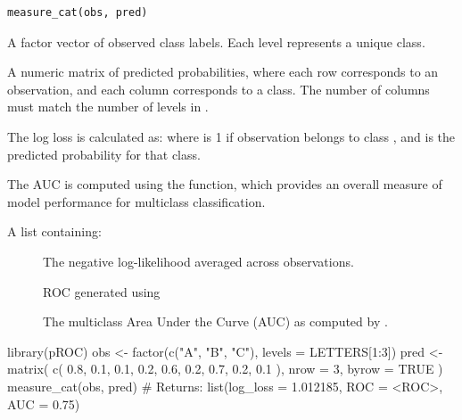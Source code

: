 \documentclass[a4paper]{book}
\begin{document}
%
\begin{Usage}
\begin{verbatim}
measure_cat(obs, pred)
\end{verbatim}
\end{Usage}
%
\begin{Arguments}
\begin{ldescription}
\item[\code{obs}] A factor vector of observed class labels. Each level represents a unique class.

\item[\code{pred}] A numeric matrix of predicted probabilities, where each row corresponds to an observation,
and each column corresponds to a class. The number of columns must match the number of levels in .
\end{ldescription}
\end{Arguments}
%
\begin{Details}
The log loss is calculated as:
where  is 1 if observation  belongs to class , and  is the
predicted probability for that class.

The AUC is computed using the  function, which provides an overall measure
of model performance for multiclass classification.
\end{Details}
%
\begin{Value}
A list containing:
\begin{description}

\item[] The negative log-likelihood averaged across observations.
\item[] ROC generated using 
\item[] The multiclass Area Under the Curve (AUC) as computed by .

\end{description}

\end{Value}
%
\begin{Examples}
\begin{ExampleCode}
library(pROC)
obs <- factor(c("A", "B", "C"), levels = LETTERS[1:3])
pred <- matrix(
  c(
    0.8, 0.1, 0.1,
    0.2, 0.6, 0.2,
    0.7, 0.2, 0.1
  ),
  nrow = 3, byrow = TRUE
)
measure_cat(obs, pred)
# Returns: list(log_loss = 1.012185, ROC = <ROC>, AUC = 0.75)

\end{ExampleCode}
\end{Examples}
\end{document}
